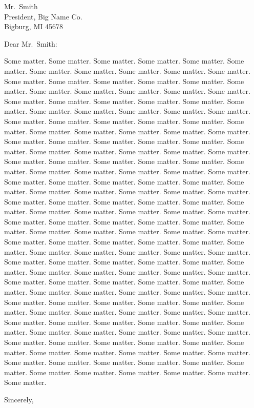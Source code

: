 \documentclass[12pt]{letter}               %
\begin{document}
\begin{letter}{Mr.~Smith\\ President,      %
   Big Name Co.\\Bigburg, MI 45678}        %
\opening{Dear Mr.~Smith:}                  %
Some matter. Some matter. Some matter. Some matter. Some matter. Some matter. Some matter. Some matter. Some matter. Some matter. Some matter. Some matter. Some matter. Some matter. Some matter. Some matter. Some matter. Some matter. Some matter. Some matter. Some matter. Some matter. Some matter. Some matter. Some matter. Some matter. Some matter. Some matter. Some matter. Some matter. Some matter. Some matter. Some matter. Some matter. Some matter. Some matter. Some matter. Some matter. Some matter. Some matter. Some matter. Some matter. Some matter. Some matter. Some matter. Some matter. Some matter. Some matter. Some matter. Some matter. Some matter. Some matter. Some matter. Some matter. Some matter. Some matter. Some matter. Some matter. Some matter. Some matter. Some matter. Some matter. Some matter. Some matter. Some matter. Some matter. Some matter. Some matter. Some matter. Some matter. Some matter. Some matter. Some matter. Some matter. Some matter. Some matter. Some matter. Some matter. Some matter. Some matter. Some matter. Some matter. Some matter. Some matter. Some matter. Some matter. Some matter. Some matter. Some matter. Some matter. Some matter. Some matter. Some matter. Some matter. Some matter. Some matter. Some matter. Some matter. Some matter. Some matter. Some matter. Some matter. Some matter. Some matter. Some matter. Some matter. Some matter. Some matter. Some matter. Some matter. Some matter. Some matter. Some matter. Some matter. Some matter. Some matter. Some matter. Some matter. Some matter. Some matter. Some matter. Some matter. Some matter. Some matter. Some matter. Some matter. Some matter. Some matter. Some matter. Some matter. Some matter. Some matter. Some matter. Some matter. Some matter. Some matter. Some matter. Some matter. Some matter. Some matter. Some matter. Some matter. Some matter. Some matter. Some matter. Some matter. Some matter. Some matter. Some matter. Some matter. Some matter. Some matter. Some matter. Some matter. Some matter. Some matter. Some matter. Some matter. Some matter. Some matter. Some matter. Some matter. Some matter. Some matter. Some matter. Some matter. Some matter. Some matter. Some matter. Some matter. Some matter. Some matter. Some matter. Some matter. Some matter. Some matter. Some matter. 
\closing{Sincerely,} %
\end{letter}         %
\end{document}
